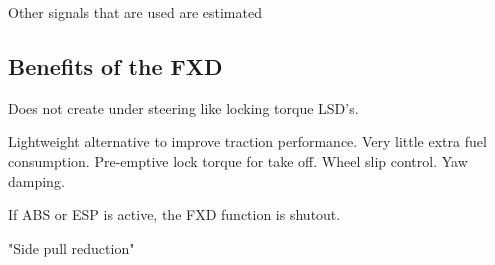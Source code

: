 Other signals that are used are estimated

\subsection{Benefits of the FXD}

Does not create under steering like locking torque LSD's. 

Lightweight alternative  to improve traction performance. Very little extra fuel consumption. Pre-emptive lock torque for take off. Wheel slip control. Yaw damping. 

If ABS or ESP is active, the FXD function is shutout. 

"Side pull reduction"
